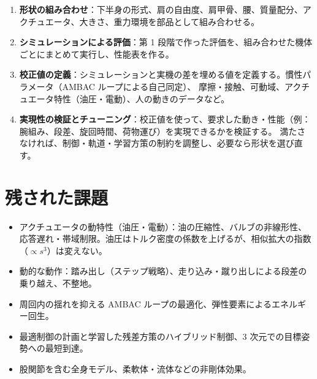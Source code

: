 \begin{enumerate}
\item \textbf{形状の組み合わせ}：下半身の形式、肩の自由度、肩甲骨、腰、質量配分、アクチュエータ、大きさ、重力環境を部品として組み合わせる。
\item \textbf{シミュレーションによる評価}：第 1 段階で作った評価を、組み合わせた機体ごとにまとめて実行し、性能表を作る。
\item \textbf{校正値の定義}：シミュレーションと実機の差を埋める値を定義する。慣性パラメータ（AMBAC ループによる自己同定）、
  摩擦・接触、可動域、アクチュエータ特性（油圧・電動）、人の動きのデータなど。
\item \textbf{実現性の検証とチューニング}：校正値を使って、要求した動き・性能（例：腕組み、段差、旋回時間、荷物運び）を実現できるかを検証する。
  満たさなければ、制御・軌道・学習方策の制約を調整し、必要なら形状を選び直す。
\end{enumerate}

\section{残された課題}

\begin{itemize}
\item アクチュエータの動特性（油圧・電動）：油の圧縮性、バルブの非線形性、応答遅れ・帯域制限。油圧はトルク密度の係数を上げるが、相似拡大の指数（$\propto s^3$）は変えない。
\item 動的な動作：踏み出し（ステップ戦略）、走り込み・蹴り出しによる段差の乗り越え、不整地。
\item 周回内の揺れを抑える AMBAC ループの最適化、弾性要素によるエネルギー回生。
\item 最適制御の計画と学習した残差方策のハイブリッド制御、3 次元での目標姿勢への最短到達。
\item 股関節を含む全身モデル、柔軟体・流体などの非剛体効果。
\end{itemize}
